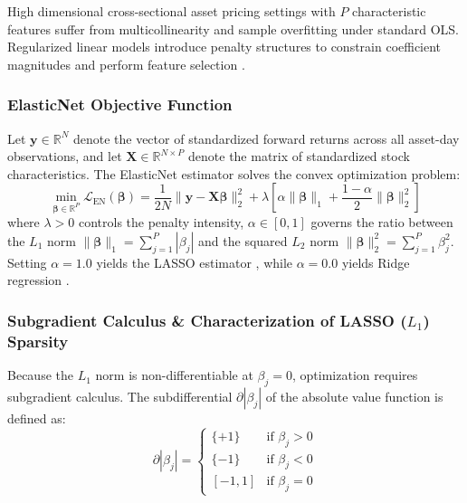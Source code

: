High dimensional cross-sectional asset pricing settings with $P$ characteristic features suffer from multicollinearity and sample overfitting under standard OLS. Regularized linear models introduce penalty structures to constrain coefficient magnitudes and perform feature selection \citep{kozak2020shrinking}.

\subsubsection{ElasticNet Objective Function}
Let $\mathbf{y} \in \mathbb{R}^N$ denote the vector of standardized forward returns across all asset-day observations, and let $\mathbf{X} \in \mathbb{R}^{N \times P}$ denote the matrix of standardized stock characteristics. The ElasticNet estimator \citep{zou2005regularization} solves the convex optimization problem:
\begin{equation}
\min_{\boldsymbol{\beta} \in \mathbb{R}^P} \mathcal{L}_{\text{EN}}(\boldsymbol{\beta}) = \frac{1}{2N} \|\mathbf{y} - \mathbf{X}\boldsymbol{\beta}\|_2^2 + \lambda \left[ \alpha \|\boldsymbol{\beta}\|_1 + \frac{1-\alpha}{2} \|\boldsymbol{\beta}\|_2^2 \right]
\label{eq:ch3_elasticnet_full}
\end{equation}
where $\lambda > 0$ controls the penalty intensity, $\alpha \in [0, 1]$ governs the ratio between the $L_1$ norm $\|\boldsymbol{\beta}\|_1 = \sum_{j=1}^P |\beta_j|$ and the squared $L_2$ norm $\|\boldsymbol{\beta}\|_2^2 = \sum_{j=1}^P \beta_j^2$. Setting $\alpha = 1.0$ yields the LASSO estimator \citep{tibshirani1996regression}, while $\alpha = 0.0$ yields Ridge regression \citep{hoerl1970ridge}.

\subsubsection{Subgradient Calculus \& Characterization of LASSO ($L_1$) Sparsity}
Because the $L_1$ norm is non-differentiable at $\beta_j = 0$, optimization requires subgradient calculus. The subdifferential $\partial |\beta_j|$ of the absolute value function is defined as:
\begin{equation}
\partial |\beta_j| = \begin{cases} 
\{ +1 \} & \text{if } \beta_j > 0 \\
\{ -1 \} & \text{if } \beta_j < 0 \\
[-1, 1] & \text{if } \beta_j = 0 
\end{cases}
\label{eq:ch3_subgradient_l1}
\end{equation}

